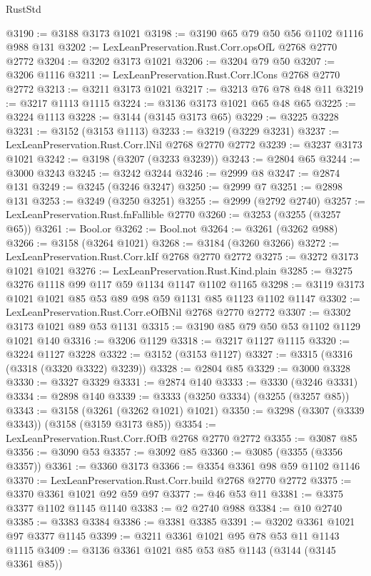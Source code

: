 \begin{lexlean}{RustStd}
\begin{coremodule}
@3190 := @3188 @3173 @1021
@3198 := @3190 @65 @79 @50 @56 @1102 @1116 @988 @131
@3202 := LexLeanPreservation.Rust.Corr.opsOfL @2768 @2770 @2772
@3204 := @3202 @3173 @1021
@3206 := @3204 @79 @50
@3207 := @3206 @1116
@3211 := LexLeanPreservation.Rust.Corr.lCons @2768 @2770 @2772
@3213 := @3211 @3173 @1021
@3217 := @3213 @76 @78 @48 @11
@3219 := @3217 @1113 @1115
@3224 := @3136 @3173 @1021 @65 @48 @65
@3225 := @3224 @1113
@3228 := @3144 (@3145 @3173 @65)
@3229 := @3225 @3228
@3231 := @3152 (@3153 @1113)
@3233 := @3219 (@3229 @3231)
@3237 := LexLeanPreservation.Rust.Corr.lNil @2768 @2770 @2772
@3239 := @3237 @3173 @1021
@3242 := @3198 (@3207 (@3233 @3239))
@3243 := @2804 @65
@3244 := @3000 @3243
@3245 := @3242 @3244
@3246 := @2999 @8
@3247 := @2874 @131
@3249 := @3245 (@3246 @3247)
@3250 := @2999 @7
@3251 := @2898 @131
@3253 := @3249 (@3250 @3251)
@3255 := @2999 (@2792 @2740)
@3257 := LexLeanPreservation.Rust.fnFallible @2770
@3260 := @3253 (@3255 (@3257 @65))
@3261 := Bool.or
@3262 := Bool.not
@3264 := @3261 (@3262 @988)
@3266 := @3158 (@3264 @1021)
@3268 := @3184 (@3260 @3266)
@3272 := LexLeanPreservation.Rust.Corr.kIf @2768 @2770 @2772
@3275 := @3272 @3173 @1021 @1021
@3276 := LexLeanPreservation.Rust.Kind.plain
@3285 := @3275 @3276 @1118 @99 @117 @59 @1134 @1147 @1102 @1165
@3298 := @3119 @3173 @1021 @1021 @85 @53 @89 @98 @59 @1131 @85 @1123 @1102 @1147
@3302 := LexLeanPreservation.Rust.Corr.eOfBNil @2768 @2770 @2772
@3307 := @3302 @3173 @1021 @89 @53 @1131
@3315 := @3190 @85 @79 @50 @53 @1102 @1129 @1021 @140
@3316 := @3206 @1129
@3318 := @3217 @1127 @1115
@3320 := @3224 @1127 @3228
@3322 := @3152 (@3153 @1127)
@3327 := @3315 (@3316 (@3318 (@3320 @3322) @3239))
@3328 := @2804 @85
@3329 := @3000 @3328
@3330 := @3327 @3329
@3331 := @2874 @140
@3333 := @3330 (@3246 @3331)
@3334 := @2898 @140
@3339 := @3333 (@3250 @3334) (@3255 (@3257 @85))
@3343 := @3158 (@3261 (@3262 @1021) @1021)
@3350 := @3298 (@3307 (@3339 @3343)) (@3158 (@3159 @3173 @85))
@3354 := LexLeanPreservation.Rust.Corr.fOfB @2768 @2770 @2772
@3355 := @3087 @85
@3356 := @3090 @53
@3357 := @3092 @85
@3360 := @3085 (@3355 (@3356 @3357))
@3361 := @3360 @3173
@3366 := @3354 @3361 @98 @59 @1102 @1146
@3370 := LexLeanPreservation.Rust.Corr.build @2768 @2770 @2772
@3375 := @3370 @3361 @1021 @92 @59 @97
@3377 := @46 @53 @11
@3381 := @3375 @3377 @1102 @1145 @1140
@3383 := @2 @2740 @988
@3384 := @10 @2740
@3385 := @3383 @3384
@3386 := @3381 @3385
@3391 := @3202 @3361 @1021 @97 @3377 @1145
@3399 := @3211 @3361 @1021 @95 @78 @53 @11 @1143 @1115
@3409 := @3136 @3361 @1021 @85 @53 @85 @1143 (@3144 (@3145 @3361 @85))

\end{coremodule}
\end{lexlean}
